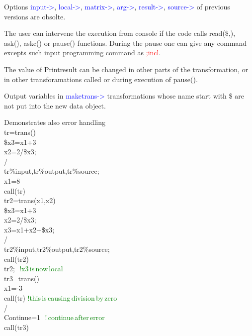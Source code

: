 \vspace{0.2cm}
\begin{note}
Options \textcolor{blue}{input->}, \textcolor{blue}{local->}, \textcolor{blue}{matrix->}, \textcolor{blue}{arg->}, \textcolor{blue}{result->}, \textcolor{blue}{source->} of previous
versions are obsolte.
\end{note}
\begin{note}
The user can intervene the execution from console if the code calls \textcolor{VioletRed}{read}(\$,),
\textcolor{VioletRed}{ask}(), \textcolor{VioletRed}{askc}() or \textcolor{VioletRed}{pause}() functions. During the pause one can give any command excepts
such input programming command as \textcolor{Red}{;incl}.
\end{note}
\begin{note}
The value of Printresult can be changed in other parts of the transformation, or
in other transforamations called or during execution of \textcolor{VioletRed}{pause}().
\end{note}
\begin{note}
Output variables in \textcolor{blue}{maketrans->} transformations whose name start with \$ are not put into the new data object.
\end{note}
\begin{example}[transex]Demonstrates also error handling\\
\label{transex}
tr=\textcolor{VioletRed}{trans}()\\
\$x3=x1+3\\
x2=2/\$x3;\\
/\\
tr\%input,tr\%output,tr\%source;\\
x1=8\\
\textcolor{VioletRed}{call}(tr)\\
tr2=\textcolor{VioletRed}{trans}(x1,x2)\\
\$x3=x1+3\\
x2=2/\$x3;\\
x3=x1+x2+\$x3;\\
/\\
tr2\%input,tr2\%output,tr2\%source;\\
\textcolor{VioletRed}{call}(tr2)\\
tr2; \,\,\textcolor{green}{!x3\,is\,now\,local}\\
tr3=\textcolor{VioletRed}{trans}()\\
x1=-3\\
\textcolor{VioletRed}{call}(tr) \textcolor{green}{!this\,is\,causing\,division\,by\,zero}\\
/\\
Continue=1 \,\,\textcolor{green}{!\,continue\,after\,error}\\
\textcolor{VioletRed}{call}(tr3)
\end{example}
